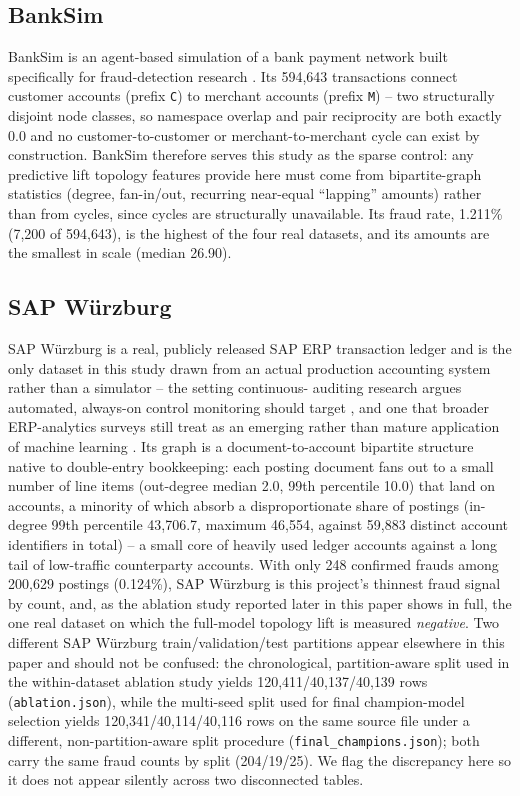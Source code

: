\subsection{BankSim}

BankSim is an agent-based simulation of a bank payment network built
specifically for fraud-detection research \cite{lopezrojas2014banksim}.
Its 594{,}643 transactions connect customer accounts (prefix \texttt{C})
to merchant accounts (prefix \texttt{M}) -- two structurally disjoint node
classes, so namespace overlap and pair reciprocity are both exactly 0.0
and no customer-to-customer or merchant-to-merchant cycle can exist by
construction. BankSim therefore serves this study as the sparse control:
any predictive lift topology features provide here must come from
bipartite-graph statistics (degree, fan-in/out, recurring near-equal
``lapping'' amounts) rather than from cycles, since cycles are
structurally unavailable. Its fraud rate, 1.211\% (7{,}200 of 594{,}643),
is the highest of the four real datasets, and its amounts are the smallest
in scale (median 26.90).

\subsection{SAP W\"urzburg}

SAP W\"urzburg is a real, publicly released SAP ERP transaction ledger and
is the only dataset in this study drawn from an actual production
accounting system rather than a simulator -- the setting continuous-
auditing research argues automated, always-on control monitoring should
target \cite{vasarhelyi2012acceptance}, and one that broader ERP-analytics
surveys still treat as an emerging rather than mature application of
machine learning \cite{jawad2024erp,mamakou2024postimplementation}. Its
graph is a document-to-account bipartite structure native to double-entry
bookkeeping: each posting document fans out to a small number of line
items (out-degree median 2.0, 99th percentile 10.0) that land on accounts,
a minority of which absorb a disproportionate share of postings (in-degree
99th percentile 43{,}706.7, maximum 46{,}554, against 59{,}883 distinct
account identifiers in total) -- a small core of heavily used ledger
accounts against a long tail of low-traffic counterparty accounts. With
only 248 confirmed frauds among 200{,}629 postings (0.124\%), SAP
W\"urzburg is this project's thinnest fraud signal by count, and, as the
ablation study reported later in this paper shows in full, the one real
dataset on which the full-model topology lift is measured
\emph{negative}. Two different SAP W\"urzburg train/validation/test
partitions appear elsewhere in this paper and should not be confused: the
chronological, partition-aware split used in the within-dataset ablation
study yields 120{,}411/40{,}137/40{,}139 rows
(\texttt{ablation.json}), while the multi-seed split used for final
champion-model selection yields 120{,}341/40{,}114/40{,}116 rows on the
same source file under a different, non-partition-aware split procedure
(\texttt{final\_champions.json}); both carry the same fraud counts by
split (204/19/25). We flag the discrepancy here so it does not appear
silently across two disconnected tables.

